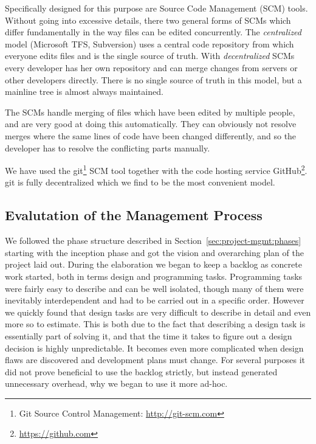 Specifically designed for this purpose are Source Code Management (SCM)
tools. Without going into excessive details, there two general forms of SCMs
which differ fundamentally in the way files can be edited concurrently. The
\textit{centralized} model (Microsoft TFS, Subversion) uses a central code
repository from which everyone edits files and is the single source of
truth. With \textit{decentralized} SCMs every developer has her own repository
and can merge changes from servers or other developers directly. There is no
single source of truth in this model, but a mainline tree is almost always
maintained.

The SCMs handle merging of files which have been edited by multiple people, and
are very good at doing this automatically. They can obviously not resolve merges
where the same lines of code have been changed differently, and so the developer
has to resolve the conflicting parts manually.

We have used the git\footnote{Git Source Control Management:
  \url{http://git-scm.com}} SCM tool together with the code hosting service
GitHub\footnote{\url{https://github.com}}. git is fully decentralized which we
find to be the most convenient model.


\subsection{Evalutation of the Management Process}

We followed the phase structure described in
Section~\ref{sec:project-mgmt:phases} starting with the inception phase and got
the vision and overarching plan of the project laid out. During the elaboration
we began to keep a backlog as concrete work started, both in terms design and
programming tasks. Programming tasks were fairly easy to describe and can be
well isolated, though many of them were inevitably interdependent and had to be
carried out in a specific order. However we quickly found that design tasks are
very difficult to describe in detail and even more so to estimate. This is both
due to the fact that describing a design task is essentially part of solving it,
and that the time it takes to figure out a design decision is highly
unpredictable. It becomes even more complicated when design flaws are discovered
and development plans must change. For several purposes it did not prove
beneficial to use the backlog strictly, but instead generated unnecessary
overhead, why we began to use it more ad-hoc.

